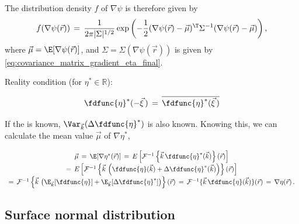 The distribution density $f$ of $\nabla\psi$ is therefore given by
%
\begin{equation} \label{eq:psi_grad_distribution}
f(\nabla\psi(\vec{r})) \,=\, \frac{1}{2\pi|\Sigma|^{1/2}}\exp\left(-\frac{1}{2}(\nabla\psi(\vec{r})-\vec{\mu})^{\T}\Sigma^{-1}(\nabla\psi(\vec{r})-\vec{\mu})\right),
\end{equation}
%
where $\vec{\mu} = \E[\nabla\psi(\vec{r})]$, and $\Sigma = \Sigma(\nabla\psi(\vec{r}))$ is given by \eqref{eq:covariance_matrix_gradient_eta_final}.

\comment
{
\HRule

Reality condition (for $\eta^*\in\mathbb{R}$):

\begin{equation}
\fdfunc{\eta}^*(-\vec{\xi}\,) \,=\, \overline{\fdfunc{\eta}^*(\vec{\xi}\,)}
\end{equation}

\HRule

If the  is known, $\Var_{\vec{k}}(\Delta\fdfunc{\eta}^*)$ is also known. Knowing this, we can calculate the mean value $\vec{\mu}$ of $\nabla\eta^*$,

\begin{equation}
\renewcommand*{\arraystretch}{1.5}
\begin{array}{c}
\vec{\mu} \,=\, \E[\nabla\eta^*(\vec{r})] \,=\, E\left[\mathcal{F}^{-1}\left\{\vec{k}\,\fdfunc{\eta}^*(\vec{k})\right\}(\vec{r})\right] \\
=\, E\left[\mathcal{F}^{-1}\left\{\vec{k}\,\left(\fdfunc{\eta}(\vec{k})+\Delta\fdfunc{\eta}^*(\vec{k})\right)\right\}(\vec{r})\right] \\
=\, \mathcal{F}^{-1}\left\{\vec{k}\,\left(\E_{\vec{k}}[\fdfunc{\eta}]+\E_{\vec{k}}[\Delta\fdfunc{\eta}^*]\right)\right\}(\vec{r}) \,=\, \mathcal{F}^{-1}\{\vec{k}\,\fdfunc{\eta}(\vec{k})\}(\vec{r}) \,=\, \nabla\eta(\vec{r})\,.
\end{array}
\end{equation}

\HRule
}

\subsection{Surface normal distribution}

